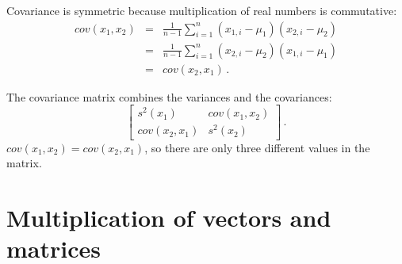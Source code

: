 Covariance is symmetric because multiplication of real numbers is commutative:
\begin{eqnarray*}
\textit{cov}(x_1,x_2) &=& \frac{1}{n-1}\sum^n_{i=1} (x_{1,i}-\mu_1)(x_{2,i}-\mu_2)\\
&=& \frac{1}{n-1}\sum^n_{i=1} (x_{2,i}-\mu_2)(x_{1,i}-\mu_1)\\
&=&\textit{cov}(x_2,x_1)\,.
\end{eqnarray*}

The covariance matrix combines the variances and the covariances:
\[
\left[ \begin{array}{ll} s^2(x_1) & \textit{cov}(x_1,x_2)\\ \textit{cov}(x_2,x_1)& s^2(x_2)\end{array}\right]\,.
\]
$\textit{cov}(x_1,x_2)=\textit{cov}(x_2,x_1)$, so there are only three different values in the matrix.

\section{Multiplication of vectors and matrices}\label{a.matrices}

